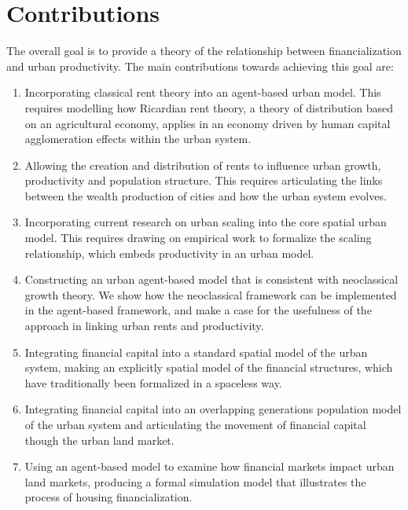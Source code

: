 \section{Contributions}
The overall goal is to provide a theory of the relationship between financialization and urban productivity. The main contributions towards achieving this goal are:
\begin{enumerate}
    \item  Incorporating \gls{classical rent theory} into an \gls{agent-based} urban model. This requires modelling how \gls{Ricardian rent theory}, a theory of distribution based on an agricultural economy, applies in an economy driven by human capital \gls{agglomeration} effects within the urban system. 

    \item Allowing the creation and distribution of rents to influence urban growth, productivity and population structure. This requires articulating the links between the wealth production of cities and how the urban system evolves.

    \item Incorporating current research on \gls{urban scaling} into the core spatial urban model.  This requires drawing on empirical work to formalize the scaling relationship, which embeds productivity in an urban model. 

    \item Constructing an urban \gls{agent-based model} that is consistent with {neoclassical growth theory}. We show how the neoclassical framework can be implemented in the agent-based framework, and make a case for the usefulness of the approach in linking urban rents and productivity. 

    \item Integrating \gls{financial capital} into a standard spatial model of the urban system, making an explicitly spatial model of the financial structures, which have traditionally been formalized in a spaceless way.
    
    \item Integrating financial capital into an \gls{overlapping generations} population model of the urban system and articulating the movement of financial capital though the urban land market. 
    
    \item Using an agent-based model to examine how financial markets impact urban \glspl{land market}, producing a formal simulation model that illustrates the process of housing financialization. 


\end{enumerate}
